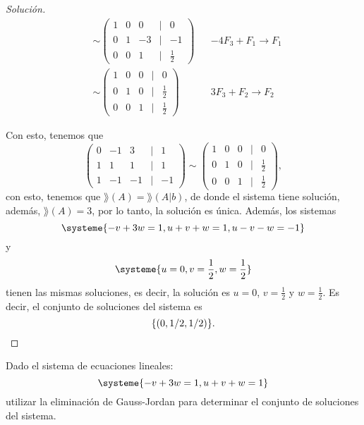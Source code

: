 \documentclass[a4,11pt]{aleph-notas}
\begin{document}
\begin{proof}[Solución]
\begin{align*}
        & \sim
        \begin{pmatrix}
            1&0&0&|&0\\
            0&1&-3&|&-1\\
            0&0&1&|&\frac 1 2
        \end{pmatrix}
        && -4F_3+F_1\to F_1\\
        & \sim 
        \begin{pmatrix}
            1&0&0&|&0\\
            0&1&0&|&\frac 1 2\\
            0&0&1&|&\frac 1 2
        \end{pmatrix}
        && 3F_3+F_2\to F_2
    \end{align*}

    Con esto, tenemos que
    \[
        \begin{pmatrix}
            0&-1&3&|&1\\
            1&1&1&|&1\\
            1&-1&-1&|&-1
        \end{pmatrix}
        \sim
        \begin{pmatrix}
            1&0&0&|&0\\
            0&1&0&|&\frac 1 2\\
            0&0&1&|&\frac 1 2
        \end{pmatrix},
    \]
    con esto, tenemos que $\rang(A)=\rang(A|b)$, de donde el sistema tiene solución, además, $\rang(A)=3$, por lo tanto, la solución es única. Además, los sistemas
    \[
        \systeme{
        -v+3w=1, u+v+w=1, u-v-w=-1
        }
    \]
    y
    \[
        \systeme{
        u=0,v=\frac 1 2 , w = \frac 1 2
        }
    \]
    tienen las mismas soluciones, es decir, la solución es $u=0$, $v=\frac 1 2$ y $w=\frac 1 2$. Es decir, el conjunto de soluciones del sistema es
    \[  
        \{(0,1/2,1/2)\}.\qedhere
    \]
\end{proof}

\begin{ejer}
    Dado el sistema de ecuaciones lineales:
    \[
        \systeme{
        -v+3w=1, u+v+w=1
        }
    \]
    utilizar la eliminación de Gauss-Jordan para determinar el conjunto de soluciones del sistema.
\end{ejer}
\end{document}
